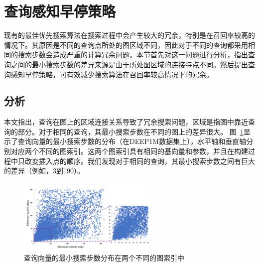 \section{查询感知早停策略}\label{sec:galg-earlystop}
现有的最佳优先搜索算法在搜索过程中会产生较大的冗余，特别是在召回率较高的情况下。其原因是不同的查询点所处的图区域不同，因此对于不同的查询都采用相同的搜索步数会造成严重的计算冗余问题。本节首先对这一问题进行分析，指出查询之间的最小搜索步数的差异来源是由于所处图区域的连接特点不同。然后提出查询感知早停策略，可有效减少搜索算法在召回率较高情况下的冗余。

\subsection{分析}
本文指出，查询在图上的区域连接关系导致了冗余搜索问题，区域是指图中靠近查询的部分。对于相同的查询，其最小搜索步数在不同的图上的差异很大。
图~\ref{fig:min-step}显示了查询向量的最小搜索步数的分布（在DEEP1M数据集上），水平轴和垂直轴分别对应两个不同的图索引。这两个图索引具有相同的基向量和参数，并且在构建过程中只改变插入点的顺序。我们发现对于相同的查询，其最小搜索步数之间有巨大的差异（例如，3到190）。
\begin{figure}[htbp]
  \centering
  \includegraphics[width=0.6\textwidth]{figures/context-1/min search step.pdf}
  \caption{查询向量的最小搜索步数分布在两个不同的图索引中}
  \label{fig:min-step}
\end{figure}

